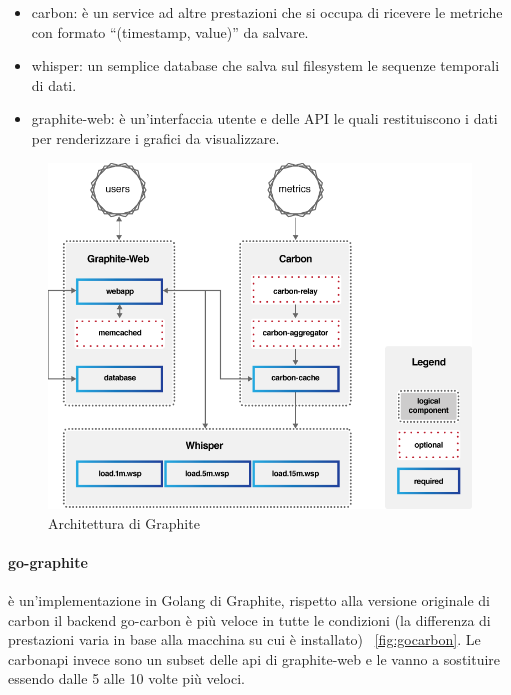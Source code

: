 \begin{itemize}
    \item carbon: è un service ad altre prestazioni che si occupa di ricevere le metriche con formato ``(timestamp, value)'' da salvare.
    \item whisper: un semplice database che salva sul filesystem le sequenze temporali di dati.
    \item graphite-web: è un'interfaccia utente e delle API le quali restituiscono i dati per renderizzare i grafici da visualizzare.
\end{itemize}

\begin{figure}[h]
     \label{fig:graphite}
    \includegraphics[width=\hsize]{images/my_work/graphite.png}
    \caption{Architettura di Graphite}
    \centering
\end{figure}

\paragraph{go-graphite} è un'implementazione in Golang di Graphite, rispetto alla versione originale di carbon il backend
go-carbon è più veloce in tutte le condizioni (la differenza di prestazioni varia in base alla macchina su cui è installato) ~\ref{fig:gocarbon}.
Le carbonapi invece sono un subset delle api di graphite-web e le vanno a sostituire essendo dalle 5 alle 10 volte più veloci.

